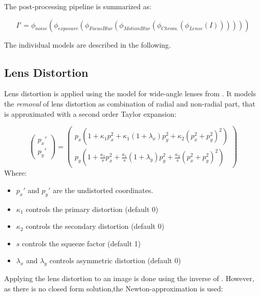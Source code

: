 The post-processing pipeline is summarized as:

\begin{equation}
	I' = \phi_{noise}(\phi_{exposure}(\phi_{FocusBlur}(\phi_{MotionBlur}(\phi_{Chrom.}(\phi_{Lense}(I))))))
	\label{eq:postprocess}
\end{equation}

The individual models are described in the following.

\subsection{Lens Distortion}


Lens distortion is applied using the model for wide-angle lenses from \cite{Vass}. It models the \textit{removal} of lens distortion as combination of radial and non-radial part, that is approximated with a second order Taylor expansion:

\begin{equation}
\begin{pmatrix}
	p_x' \\
	p_y'
\end{pmatrix} = \begin{pmatrix}
p_x(1 + \kappa_1 p_x^2 + \kappa_1 (1 + \lambda _x)p_y^2 + \kappa_2(p_x^2 + p_y^2)^2) \\
p_y(1 + \frac{\kappa_1 }{s}p_x^2 + \frac{\kappa_1}{s} (1 + \lambda _y)p_y^2 + \frac{\kappa_2}{s}(p_x^2 + p_y^2)^2)
\end{pmatrix} 
\label{eq:distortion}
\end{equation}
Where:
\begin{itemize}
	\item $p_x'$ and $p_y'$ are the undistorted coordinates.
	\item $\kappa_1$ controls the primary distortion (default 0)
	\item $\kappa_2$ controls the secondary distortion (default 0)
	\item $s$ controls the squeeze factor (default 1)
	\item $\lambda_x$ and $\lambda_y$ controls asymmetric distortion (default 0)
\end{itemize}
 
Applying the lens distortion to an image is done using the inverse of . However, as there is no closed form solution,the Newton-approximation is used:

